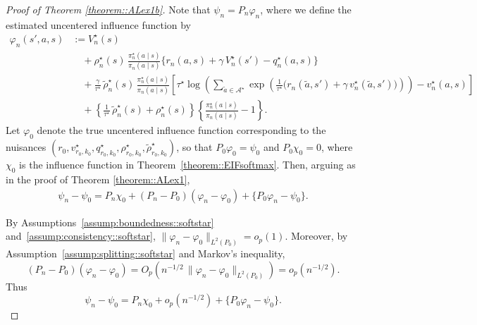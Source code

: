 \documentclass[11pt]{article}
\theoremstyle{plain}
\begin{document}
\begin{proof}[Proof of Theorem \ref{theorem::ALex1b}]
Note that $\psi_n = P_n \varphi_n$, where we define the estimated uncentered influence function by
\begin{align*}
\varphi_n(s',a,s)
&:= V_n^\star(s) \\
&\quad + \rho_n^\star(s)\,
        \frac{\pi_n^\star(a \mid s)}{\pi_n(a \mid s)}
        \bigl\{r_n(a,s) + \gamma\,V_n^\star(s') - q_n^\star(a,s)\bigr\} \\
&\quad + \frac{\gamma}{\tau^\star}\,
        \widetilde{\rho}_n^\star(s)\,
        \frac{\pi_n^\star(a \mid s)}{\pi_n(a \mid s)}
        \left[
           \tau^\star \log\!\left( 
                \sum_{\tilde a \in \mathcal{A}^\star} 
                \exp\!\left( 
                    \tfrac{1}{\tau^\star}\bigl( r_n(\tilde a,s') + \gamma\,v_n^\star(\tilde a,s') \bigr) 
                \right)
            \right)
            - v_n^\star(a,s)
        \right] \\
&\quad 
    + \left\{
            \tfrac{1}{\tau^\star}\,\widetilde{\rho}_n^\star(s)
            + \rho_n^\star(s)
      \right\}
      \left\{ 
            \tfrac{\pi_n^\star(a \mid s)}{\pi_n(a \mid s)} - 1 
      \right\}.
\end{align*}
Let $\varphi_0$ denote the true uncentered influence function corresponding to the nuisances 
$(r_0, v_{r_0,k_0}^\star, q_{r_0,k_0}^\star, \rho_{r_0,k_0}^\star, \widetilde{\rho}_{r_0,k_0}^\star)$, so that $P_0 \varphi_0 = \psi_0$ and $P_0\chi_0 = 0$, where $\chi_0$ is the influence function in Theorem~\ref{theorem::EIFsoftmax}. Then, arguing as in the proof of Theorem \ref{theorem::ALex1},
\begin{align*}
    \psi_n - \psi_0 = P_n \chi_0 + (P_n - P_0)(\varphi_n - \varphi_0) + \{P_0 \varphi_n - \psi_0\}.
\end{align*}

By Assumptions~\ref{assump:boundedness::softstar} and~\ref{assump:consistency::softstar}, 
$\|\varphi_n - \varphi_0\|_{L^2(P_0)} = o_p(1)$. Moreover, by
Assumption~\ref{assump:splitting::softstar} and Markov’s inequality,
\[
(P_n - P_0)(\varphi_n - \varphi_0)
= O_p\!\left(n^{-1/2}\,\|\varphi_n - \varphi_0\|_{L^2(P_0)}\right)
= o_p(n^{-1/2}).
\]
Thus
\[
\psi_n - \psi_0
= P_n \chi_0 + o_p(n^{-1/2}) + \{P_0 \varphi_n - \psi_0\}.
\]


\end{proof}
\end{document}
